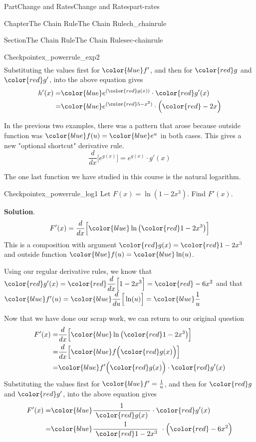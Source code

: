 \documentclass{tufte-book}
\newcommand{\blocktitlefont}{\relax}
\numberwithin{equation}{chapter}
\newcommand{\red}[1]{   {\color{red}   #1}   }
\newcommand{\blue}[1]{  {\color{blue}  #1}  }
\newcommand{\ddx}[1]{ \dfrac{d}{dx} \Big[ #1 \Big]  }
\newcommand{\ddu}[1]{ \dfrac{d}{du} \Big[ #1 \Big]  }
\newcommand{\amp}{&}
\begin{document}
\begin{partptx}{Part}{Change and Rates}{}{Change and Rates}{}{}{part-rates}
\begin{chapterptx}{Chapter}{The Chain Rule}{}{The Chain Rule}{}{}{ch_chainrule}
\begin{sectionptx}{Section}{The Chain Rule}{}{The Chain Rule}{}{}{sec-chainrule}
\begin{inlineexercise}{Checkpoint}{}{ex_powerrule_exp2}
\begin{align*}
\end{align*}
Substituting the values first for \(\blue{f'}\), and then for  \(\red{g}\) and \(\red{g'}\), into the above equation gives%
\begin{align*}
h'(x) = \amp 
\blue{ e^{(\red{g(x)})} }\cdot \red{g'(x)}\\
= \amp 
\blue{ e^{(\red{5-x^2})} }\cdot \Big(\red{-2x}\Big)
\end{align*}
%
\end{inlineexercise}%
In the previous two examples, there was a pattern that arose because outside function was \(\blue{f(u)} = \blue{e^{u}}\) in both cases.  This gives a new "optional shortcut" derivative rule.%
\begin{equation*}
\ddx{ e^{g(x)}} = e^{g(x)} \cdot g'(x) 
\end{equation*}
%
\par
The one last function we have studied in this course is the natural logarithm.%
\begin{inlineexercise}{Checkpoint}{}{ex_powerrule_log1}%
Let \(F(x) = \ln( 1- 2x^3)\).  Find \(F'(x)\).%
\par\smallskip%
\noindent\textbf{\blocktitlefont Solution}.\hypertarget{ex_powerrule_log1-2}{}\quad{}%
\begin{equation*}
F'(x) = \ddx{ \blue{ \ln\big( \red{1-2x^3} \big) } }
\end{equation*}
This is a composition with argument \(\red{g(x)} = \red{1-2x^3}\) and outside function \(\blue{f(u)} = \blue{ \ln(u) }\).%
\par
Using our regular derivative rules, we know that \(\red{g'(x)} 
= \red{ \ddx{1-2x^3} } = \red{-6x^2} \) and that \(\blue{f'(u)} 
= \blue{\ddu{ \ln(u) }} = \blue{\dfrac{1}{u}} \)%
\par
Now that we have done our scrap work, we can return to our original question%
\begin{align*}
F'(x) = \amp 
\ddx{\blue{ \ln\big(\red{1-2x^3}\big) } }  \\
= \amp \ddx{ \blue{f\Big( \red{g(x)} \Big) } }\\
= \amp \blue{f'\Big( \red{g(x)}\Big)}\cdot \red{g'(x)}
\end{align*}
Substituting the values first for \(\blue{f'}= \frac{1}{u}\), and then for  \(\red{g}\) and \(\red{g'}\), into the above equation gives%
\begin{align*}
F'(x) = \amp 
\blue{ \frac{1}{\ \red{g(x)}\ } }\cdot \red{g'(x)}\\
= \amp 
\blue{ \frac{1}{\ \red{1-2x^3}}\ }\cdot \Big(\red{-6x^2}\Big)

\end{align*}
\end{inlineexercise}
\end{sectionptx}
\end{chapterptx}
\end{partptx}
\end{document}

